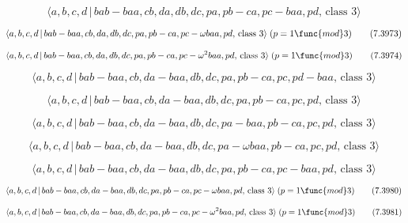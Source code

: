 \documentclass[10pt]{article}
\begin{document}
\begin{equation}
\langle a,b,c,d\,|\,bab-baa,cb,da,db,dc,pa,pb-ca,pc-baa,pd,\,\text{class }%
3\rangle  \tag{7.3972}
\end{equation}

\begin{equation}
\langle a,b,c,d\,|\,bab-baa,cb,da,db,dc,pa,pb-ca,pc-\omega baa,pd,\,\text{%
class }3\rangle \;(p=1\func{mod}3)  \tag{7.3973}
\end{equation}

\begin{equation}
\langle a,b,c,d\,|\,bab-baa,cb,da,db,dc,pa,pb-ca,pc-\omega ^{2}baa,pd,\,%
\text{class }3\rangle \;(p=1\func{mod}3)  \tag{7.3974}
\end{equation}

\begin{equation}
\langle a,b,c,d\,|\,bab-baa,cb,da-baa,db,dc,pa,pb-ca,pc,pd-baa,\,\text{class 
}3\rangle  \tag{7.3975}
\end{equation}

\begin{equation}
\langle a,b,c,d\,|\,bab-baa,cb,da-baa,db,dc,pa,pb-ca,pc,pd,\,\text{class }%
3\rangle  \tag{7.3976}
\end{equation}

\begin{equation}
\langle a,b,c,d\,|\,bab-baa,cb,da-baa,db,dc,pa-baa,pb-ca,pc,pd,\,\text{class 
}3\rangle  \tag{7.3977}
\end{equation}

\begin{equation}
\langle a,b,c,d\,|\,bab-baa,cb,da-baa,db,dc,pa-\omega baa,pb-ca,pc,pd,\,%
\text{class }3\rangle  \tag{7.3978}
\end{equation}

\begin{equation}
\langle a,b,c,d\,|\,bab-baa,cb,da-baa,db,dc,pa,pb-ca,pc-baa,pd,\,\text{class 
}3\rangle  \tag{7.3979}
\end{equation}

\begin{equation}
\langle a,b,c,d\,|\,bab-baa,cb,da-baa,db,dc,pa,pb-ca,pc-\omega baa,pd,\,%
\text{class }3\rangle \;(p=1\func{mod}3)  \tag{7.3980}
\end{equation}

\begin{equation}
\langle a,b,c,d\,|\,bab-baa,cb,da-baa,db,dc,pa,pb-ca,pc-\omega ^{2}baa,pd,\,%
\text{class }3\rangle \;(p=1\func{mod}3)  \tag{7.3981}
\end{equation}
\end{document}
